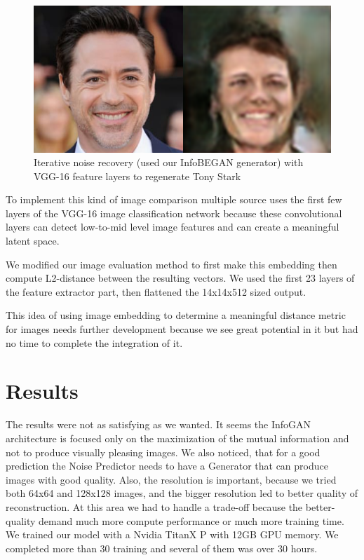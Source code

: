 \documentclass{egpubl}
\begin{document}
\begin{figure}[!htb]
	\centering
	\includegraphics[width=1\linewidth]{pic/InfoBEGAN_tony_recovered_VGG16}
	\caption{Iterative noise recovery (used our InfoBEGAN generator) with VGG-16 feature layers to regenerate Tony Stark}

\end{figure}

To implement this kind of image comparison multiple source \cite{abdal2019image2stylegan} uses the first few layers of the VGG-16 image classification network because these convolutional layers can detect low-to-mid level image features and can create a meaningful latent space.



We modified our image evaluation method to first make this embedding then compute L2-distance between the resulting vectors. We used the first 23 layers of the feature extractor part, then flattened the 14x14x512 sized output.

This idea of using image embedding to determine a meaningful distance metric for images needs further development because we see great potential in it but had no time to complete the integration of it.


\section{Results}
The results were not as satisfying as we wanted. It seems the InfoGAN architecture is focused only on the maximization of the mutual information and not to produce visually pleasing images. We also noticed, that for a good prediction the Noise Predictor needs to have a Generator that can produce images with good quality. Also, the resolution is important, because we tried both 64x64 and 128x128 images, and the bigger resolution led to better quality of reconstruction. At this area we had to handle a trade-off because the better-quality demand much more compute performance or much more training time. We trained our model with a Nvidia TitanX P with 12GB GPU memory. We completed more than 30 training and several of them was over 30 hours.
\end{document}
